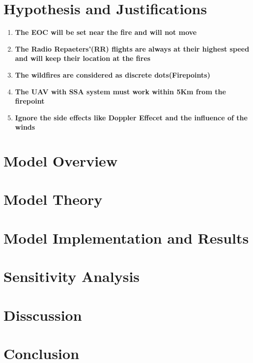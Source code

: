 \documentclass{mcmthesis}
\begin{document}
\section{Hypothesis and Justifications}
\begin{enumerate}
  \item \textbf{The EOC will be set near the fire and will not move}
  \item \textbf{The Radio Repaeters'(RR) flights are always at their highest speed and will keep their location at the fires}
  \item \textbf{The wildfires are considered as discrete dots(Firepoints)} 
  \item \textbf{The UAV with SSA system must work within 5Km from the firepoint}
  \item \textbf{Ignore the side effects like Doppler Effecet and the influence of the winds}
\end{enumerate}

\section{Model Overview}

\section{Model Theory}

\section{Model Implementation and Results}

\section{Sensitivity Analysis}

\section{Disscussion}

\section{Conclusion}
\end{document}
